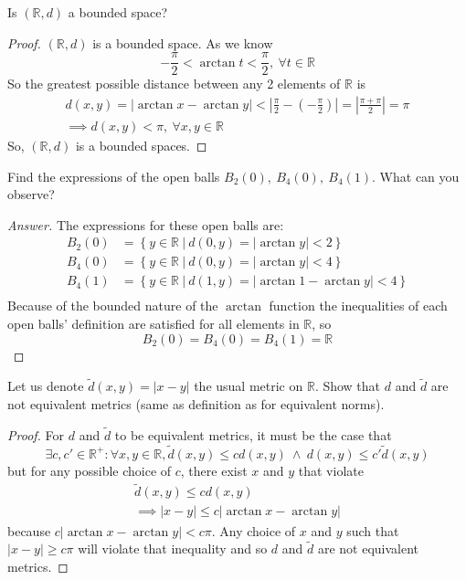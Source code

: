 \documentclass{article}
\newcommand{\abs}[1]{\left|#1\right|}
\newcommand{\parens}[1]{\left(#1\right)}
\newcommand{\bracks}[1]{\left\{#1\right\}}
\newcommand{\R}{\mathbb{R}}
\begin{document}
    \item Is $\parens{\R, d}$ a bounded space?
    \begin{proof}
    $\parens{\R, d}$ is a bounded space. As we know 
    $$-\frac{\pi}{2} < \arctan t < \frac{\pi}{2},\ \forall t \in \R$$
    So the greatest possible distance between any 2 elements of $\R$
    is
    \begin{gather*} 
    d(x,y) = \abs{\arctan x - \arctan y} < 
    \abs{\frac{\pi}{2} - \parens{-\frac{\pi}{2}}} = \abs{\frac{\pi 
    + \pi}{2}} = \pi \\
    \implies d(x,y) < \pi,\ \forall x,y \in \R
    \end{gather*}
    So, $\parens{\R, d}$ is a bounded spaces.
    \end{proof}
    
    \item Find the expressions of the open balls $B_2(0),\ B_4(0),\
    B_4(1)$. What can you observe?
    \begin{proof}[Answer]
    The expressions for these open balls are:
    \begin{align*}
    B_2(0) &= \bracks{y \in \R\ \big|\ d(0,y) = \abs{\arctan y} < 2} 
    \\
    B_4(0) &= \bracks{y \in \R\ \big|\ d(0,y) = \abs{\arctan y} < 4}
    \\
    B_4(1) &= \bracks{y \in \R\ \big|\ d(1,y) = 
    \abs{\arctan 1 - \arctan y} < 4} \\
    \end{align*}
    Because of the bounded nature of the $\arctan$ function the
    inequalities of each open balls' definition are satisfied for all
    elements in $\R$, so
    $$B_2(0) = B_4(0) = B_4(1) = \R$$
    \end{proof}
    
    \item Let us denote $\tilde{d}(x,y) = \abs{x-y}$ the usual metric
    on $\R$. Show that $d$ and $\tilde{d}$ are not equivalent metrics
    (same as definition as for equivalent norms).
    \begin{proof}
    For $d$ and $\tilde{d}$ to be equivalent metrics, it must be the
    case that
    $$\exists c, c' \in \R^+ : \forall x,y \in \R, 
    \tilde{d}(x,y) \leq cd(x,y)\ \wedge\ d(x,y) \leq c'\tilde{d}(x,y)
    $$
    but for any possible choice of $c$, there exist $x$ and $y$ that
    violate 
    \begin{gather*}
    \tilde{d}(x,y) \leq cd(x,y) \\
    \implies \abs{x-y} \leq c\abs{\arctan x - \arctan y}
    \end{gather*}
    because $c\abs{\arctan x - \arctan y} < c\pi$. Any choice of 
    $x$ and $y$ such that $\abs{x-y} \geq c\pi$ will violate that 
    inequality and so $d$ and $\tilde{d}$ are not equivalent metrics.
    \end{proof}
    
\end{document}
